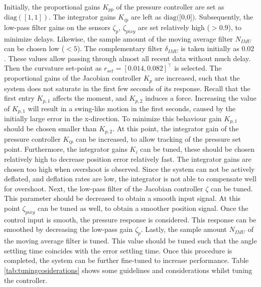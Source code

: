 Initially, the proportional gains $K_{pp}$ of the pressure controller are set as $\text{diag}([1,1])$. The integrator gains $K_{ip}$ are left as $\text{diag([0,0])}$. Subsequently, the low-pass filter gains on the sensors $\zeta_p$, $\zeta_{pixy}$ are set relatively high ($>0.9$), to minimize delays. Likewise, the sample amount of the moving average filter $N_{IMU}$ can be chosen low ($<5$). The complementary filter $\delta_{IMU}$ is taken initially as 0.02 \cite{compfilter}. These values allow passing through almost all recent data without much delay. Then the curvature set-point as $r_{set} = [0.014,0.082]^\top$ is selected. The proportional gains of the Jacobian controller $K_p$ are increased, such that the system does not saturate in the first few seconds of its response. Recall that the first entry $K_{p,1}$ affects the moment, and $K_{p,2}$ induces a force. Increasing the value of $K_{p,1}$ will result in a swing-like motion in the first seconds, caused by the initially large error in the x-direction. To minimize this behaviour gain $K_{p,1}$ should be chosen smaller than $K_{p,2}$. At this point, the integrator gain of the pressure controller $K_{ip}$ can be increased, to allow tracking of the pressure set point. Furthermore, the integrator gains $K_i$ can be tuned, these should be chosen relatively high to decrease position error relatively fast. The integrator gains are chosen too high when overshoot is observed. Since the system can not be actively deflated, and deflation rates are low, the integrator is not able to compensate well for overshoot. Next, the low-pass filter of the Jacobian controller $\zeta$ can be tuned. This parameter should be decreased to obtain a smooth input signal. At this point $\zeta_{pixy}$ can be tuned as well, to obtain a smoother position signal. Once the control input is smooth, the pressure response is considered. This response can be smoothed by decreasing the low-pass gain $\zeta_p$. Lastly, the sample amount $N_{IMU}$ of the moving average filter is tuned. This value should be tuned such that the angle settling time coincides with the error settling time. Once this procedure is completed, the system can be further fine-tuned to increase performance. Table \ref{tab:tuningcosiderations} shows some guidelines and considerations whilst tuning the controller.



